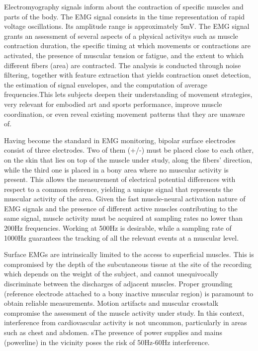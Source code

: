 Electromyography signals inform about the contraction of specific muscles and parts of the body. The EMG signal consists in the time representation of rapid voltage oscillations. Its amplitude range is approximately 5mV. The EMG signal grants an assessment of several aspects of a physical activitys such as muscle contraction duration, the specific timing at which movements or contractions are activated, the presence of muscular tension or fatigue, and the extent to which different fibers (area) are contracted. The analysis is conducted through noise filtering, together with feature extraction that yields contraction onset detection, the estimation of signal envelopes, and the computation of average frequencies.This lets subjects deepen their understanding of movement strategies, very relevant for embodied art and sports performance, improve muscle coordination, or even reveal existing movement patterns that they are unaware of.

Having become the standard in EMG monitoring, bipolar surface electrodes consist of three electrodes. Two of them (+/-) must be placed close to each other, on the skin that lies on top of the muscle under study, along the fibers' direction, while the third one is placed in a bony area where no muscular activity is present. This allows the measurement of electrical potential differences with respect to a common reference, yielding a unique signal that represents the muscular activity of the area. Given the fast muscle-neural activation nature of EMG signals and the presence of different active muscles contributing to the same signal, muscle activity must be acquired at sampling rates no lower than 200Hz frequencies. Working at 500Hz is desirable, while a sampling rate of 1000Hz guarantees the tracking of all the relevant events at a muscular level.

Surface EMGs are intrinsically limited to the access to superficial muscles. This is compromised by the depth of the subcutaneous tissue at the site of the recording which depends on the weight of the subject, and cannot unequivocally discriminate between the discharges of adjacent muscles.
Proper grounding (reference electrode attached to a bony inactive muscular region) is paramount to obtain reliable measurements. Motion artifacts and muscular crosstalk compromise the assessment of the muscle activity under study. In this context, interference from cardiovascular activity is not uncommon, particularly in areas such as chest and abdomen. sThe presence of power supplies and mains (powerline) in the vicinity poses the risk of 50Hz-60Hz interference.


